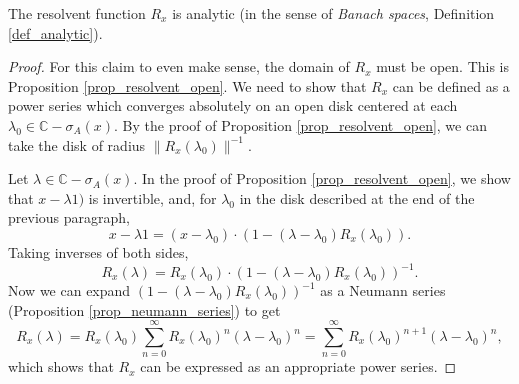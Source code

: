 \documentclass[12pt]{article}
\begin{document}
\begin{proposition}
\label{prop_resolvent_analytic}
	The resolvent function $R_x$ is analytic (in the sense of \textit{Banach spaces}, Definition \ref{def_analytic}).
\end{proposition}
\begin{proof}
	For this claim to even make sense, the domain of $R_x$ must be open. This is Proposition \ref{prop_resolvent_open}. We need to show that $R_x$ can be defined as a power series which converges absolutely on an open disk centered at each $\lambda_0\in\mathbb{C}-\sigma_A(x)$. By the proof of Proposition \ref{prop_resolvent_open}, we can take the disk of radius $\|R_x(\lambda_0)\|^{-1}$.

	Let $\lambda\in\mathbb{C}-\sigma_A(x)$. In the proof of Proposition \ref{prop_resolvent_open}, we show that $x-\lambda 1)$ is invertible, and, for $\lambda_0$ in the disk described at the end of the previous paragraph, 
	\begin{equation*}
		x-\lambda 1 = (x - \lambda_0)\cdot (1 - (\lambda-\lambda_0)R_x(\lambda_0)).
	\end{equation*}
	Taking inverses of both sides,
	\begin{equation*}
		R_x(\lambda) = R_x(\lambda_0) \cdot (1 - (\lambda - \lambda_0)R_x(\lambda_0))^{-1}.
	\end{equation*}
	Now we can expand $(1 - (\lambda - \lambda_0)R_x(\lambda_0))^{-1}$ as a Neumann series (Proposition \ref{prop_neumann_series}) to get
	\begin{equation*}
		R_x(\lambda) = R_x(\lambda_0) \sum_{n=0}^\infty R_x(\lambda_0)^n (\lambda-\lambda_0)^n = \sum_{n=0}^\infty R_x(\lambda_0)^{n+1}(\lambda - \lambda_0)^n,
	\end{equation*}
	which shows that $R_x$ can be expressed as an appropriate power series.
\end{proof}
\end{document}
